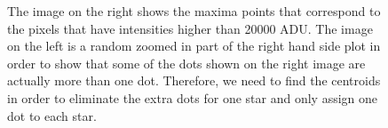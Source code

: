 \documentclass[letterpaper,12pt]{article}
\begin{document}
\begin{figure}
                                                                                                                                                                                                                                                                                                                                                                                                                                                                                                                                                                                                                                                                                                                                                                                                                                                                                                                                                                            \caption{The image on the right shows the maxima points that correspond to the pixels that have intensities higher than 20000 ADU. The image on the left is a random zoomed in part of the right hand side plot in order to show that some of the dots shown on the right image are actually more than one dot. Therefore, we need to find the centroids in order to eliminate the extra dots for one star and only assign one dot to each star.}                                                                                                                                                                                                                                                                                                                                                                                                                                                                                                                                                                                                                                                                                                                                                                                                                                                                                                                                                                                                                                                                                                                                                                                                                                                                                                                                                                                                                                                                                                                                                                                                                                                                                                                                                                                                                                                                                                                                                                                                                            
\end{figure}
\end{document}

